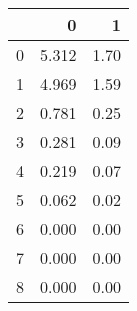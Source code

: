 \begin{tabular}{lrr}
\toprule
{} &      0 &     1 \\
\midrule
0 &  5.312 &  1.70 \\
1 &  4.969 &  1.59 \\
2 &  0.781 &  0.25 \\
3 &  0.281 &  0.09 \\
4 &  0.219 &  0.07 \\
5 &  0.062 &  0.02 \\
6 &  0.000 &  0.00 \\
7 &  0.000 &  0.00 \\
8 &  0.000 &  0.00 \\
\bottomrule
\end{tabular}
